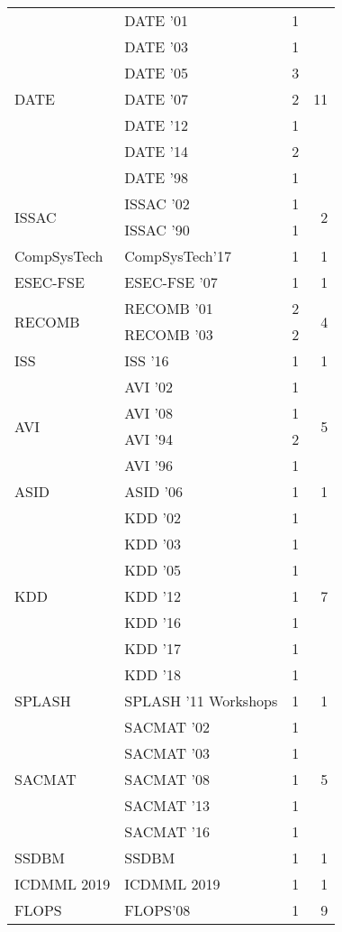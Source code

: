 \begin{table*}[t]
\begin{tabular}{llrr}
\multirow{7}{*}{DATE } & DATE '01 & 1 & \multirow{7}{*}{11}\\
& DATE '03 & 1 &\\
& DATE '05 & 3 &\\
& DATE '07 & 2 &\\
& DATE '12 & 1 &\\
& DATE '14 & 2 &\\
& DATE '98 & 1 &\\
\multirow{2}{*}{ISSAC } & ISSAC '02 & 1 & \multirow{2}{*}{2}\\
& ISSAC '90 & 1 &\\
\multirow{1}{*}{CompSysTech} & CompSysTech'17 & 1 & \multirow{1}{*}{1}\\
\multirow{1}{*}{ESEC-FSE } & ESEC-FSE '07 & 1 & \multirow{1}{*}{1}\\
\multirow{2}{*}{RECOMB } & RECOMB '01 & 2 & \multirow{2}{*}{4}\\
& RECOMB '03 & 2 &\\
\multirow{1}{*}{ISS } & ISS '16 & 1 & \multirow{1}{*}{1}\\
\multirow{4}{*}{AVI } & AVI '02 & 1 & \multirow{4}{*}{5}\\
& AVI '08 & 1 &\\
& AVI '94 & 2 &\\
& AVI '96 & 1 &\\
\multirow{1}{*}{ASID } & ASID '06 & 1 & \multirow{1}{*}{1}\\
\multirow{7}{*}{KDD } & KDD '02 & 1 & \multirow{7}{*}{7}\\
& KDD '03 & 1 &\\
& KDD '05 & 1 &\\
& KDD '12 & 1 &\\
& KDD '16 & 1 &\\
& KDD '17 & 1 &\\
& KDD '18 & 1 &\\
\multirow{1}{*}{SPLASH } & SPLASH '11 Workshops & 1 & \multirow{1}{*}{1}\\
\multirow{5}{*}{SACMAT } & SACMAT '02 & 1 & \multirow{5}{*}{5}\\
& SACMAT '03 & 1 &\\
& SACMAT '08 & 1 &\\
& SACMAT '13 & 1 &\\
& SACMAT '16 & 1 &\\
\multirow{1}{*}{SSDBM} & SSDBM & 1 & \multirow{1}{*}{1}\\
\multirow{1}{*}{ICDMML 2019} & ICDMML 2019 & 1 & \multirow{1}{*}{1}\\
\multirow{3}{*}{FLOPS} & FLOPS'08 & 1 & \multirow{3}{*}{9}\\

\end{tabular}
\end{table*}
